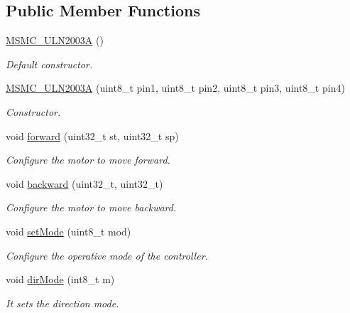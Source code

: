 \subsection*{Public Member Functions}
\begin{DoxyCompactItemize}
\item 
\hyperlink{class_m_s_m_c___u_l_n2003_a_a7b3b007290d0913572c5d42f23f6ed9a}{M\+S\+M\+C\+\_\+\+U\+L\+N2003\+A} ()
\begin{DoxyCompactList}\small\item\em Default constructor. \end{DoxyCompactList}\item 
\hyperlink{class_m_s_m_c___u_l_n2003_a_ae653d15c96f4e8ddfb4476cc77495ad1}{M\+S\+M\+C\+\_\+\+U\+L\+N2003\+A} (uint8\+\_\+t pin1, uint8\+\_\+t pin2, uint8\+\_\+t pin3, uint8\+\_\+t pin4)
\begin{DoxyCompactList}\small\item\em Constructor. \end{DoxyCompactList}\item 
void \hyperlink{class_m_s_m_c___u_l_n2003_a_a9657492f948a75472b311bc0b823899f}{forward} (uint32\+\_\+t st, uint32\+\_\+t sp)
\begin{DoxyCompactList}\small\item\em Configure the motor to move forward. \end{DoxyCompactList}\item 
void \hyperlink{class_m_s_m_c___u_l_n2003_a_ac46e6ec6345f95b534079bcf2920885e}{backward} (uint32\+\_\+t, uint32\+\_\+t)
\begin{DoxyCompactList}\small\item\em Configure the motor to move backward. \end{DoxyCompactList}\item 
void \hyperlink{class_m_s_m_c___u_l_n2003_a_a8a7f8b7e0048b3a03c87bd830d4a455f}{set\+Mode} (uint8\+\_\+t mod)
\begin{DoxyCompactList}\small\item\em Configure the operative mode of the controller. \end{DoxyCompactList}\item 
void \hyperlink{class_m_s_m_c___u_l_n2003_a_aa6fa72db041edb1c9859d4620a07f52c}{dir\+Mode} (int8\+\_\+t m)
\begin{DoxyCompactList}\small\item\em It sets the direction mode. \end{DoxyCompactList}\item 

\end{DoxyCompactItemize}
